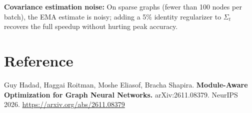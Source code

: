 \documentclass[10pt,twocolumn]{article}
\begin{document}
\textbf{Covariance estimation noise:} On sparse graphs (fewer than 100 nodes
per batch), the EMA estimate is noisy; adding a 5\% identity regularizer
to $\Sigma_t$ recovers the full speedup without hurting peak accuracy.

\section*{Reference}

Guy Hadad, Haggai Roitman, Moshe Eliasof, Bracha Shapira.
\textbf{Module-Aware Optimization for Graph Neural Networks.}
arXiv:2611.08379. NeurIPS 2026.
\url{https://arxiv.org/abs/2611.08379}
\end{document}
